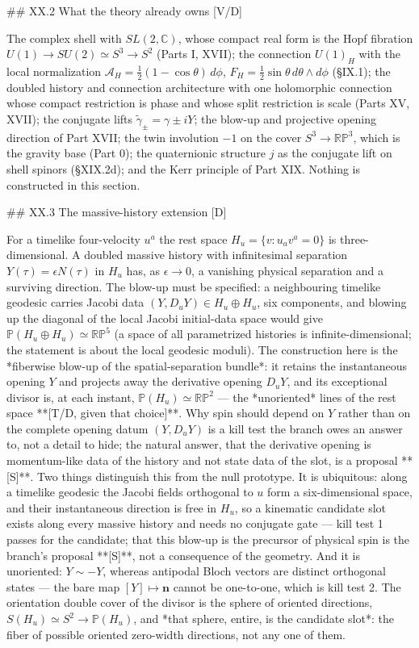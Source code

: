 ## XX.2 What the theory already owns [V/D]

The complex shell with $SL(2,\mathbb C)$, whose compact real form is the Hopf fibration $U(1)\to SU(2)\simeq S^3\to S^2$ (Parts I, XVII); the connection $U(1)_H$ with the local normalization $\mathcal A_H = \tfrac12(1-\cos\theta)\,d\phi$, $F_H = \tfrac12\sin\theta\,d\theta\wedge d\phi$ (§IX.1); the doubled history and connection architecture with one holomorphic connection whose compact restriction is phase and whose split restriction is scale (Parts XV, XVII); the conjugate lifts $\tilde\gamma_\pm = \gamma\pm iY$; the blow-up and projective opening direction of Part XVII; the twin involution $-1$ on the cover $S^3\to\mathbb{RP}^3$, which is the gravity base (Part 0); the quaternionic structure $j$ as the conjugate lift on shell spinors (§XIX.2d); and the Kerr principle of Part XIX. Nothing is constructed in this section.

## XX.3 The massive-history extension [D]

For a timelike four-velocity $u^a$ the rest space $H_u = \{v:u_av^a = 0\}$ is three-dimensional. A doubled massive history with infinitesimal separation $Y(\tau) = \epsilon N(\tau)$ in $H_u$ has, as $\epsilon\to0$, a vanishing physical separation and a surviving direction. The blow-up must be specified: a neighbouring timelike geodesic carries Jacobi data $(Y,D_uY)\in H_u\oplus H_u$, six components, and blowing up the diagonal of the local Jacobi initial-data space would give $\mathbb P(H_u\oplus H_u)\simeq\mathbb{RP}^5$ (a space of all parametrized histories is infinite-dimensional; the statement is about the local geodesic moduli). The construction here is the *fiberwise blow-up of the spatial-separation bundle*: it retains the instantaneous opening $Y$ and projects away the derivative opening $D_uY$, and its exceptional divisor is, at each instant, $\mathbb P(H_u)\simeq\mathbb{RP}^2$ — the *unoriented* lines of the rest space **[T/D, given that choice]**. Why spin should depend on $Y$ rather than on the complete opening datum $(Y,D_uY)$ is a kill test the branch owes an answer to, not a detail to hide; the natural answer, that the derivative opening is momentum-like data of the history and not state data of the slot, is a proposal **[S]**. Two things distinguish this from the null prototype. It is ubiquitous: along a timelike geodesic the Jacobi fields orthogonal to $u$ form a six-dimensional space, and their instantaneous direction is free in $H_u$, so a kinematic candidate slot exists along every massive history and needs no conjugate gate — kill test 1 passes for the candidate; that this blow-up is the precursor of physical spin is the branch's proposal **[S]**, not a consequence of the geometry. And it is unoriented: $Y\sim-Y$, whereas antipodal Bloch vectors are distinct orthogonal states — the bare map $[Y]\mapsto\mathbf n$ cannot be one-to-one, which is kill test 2. The orientation double cover of the divisor is the sphere of oriented directions, $S(H_u)\simeq S^2\to\mathbb P(H_u)$, and *that sphere, entire, is the candidate slot*: the fiber of possible oriented zero-width directions, not any one of them.

